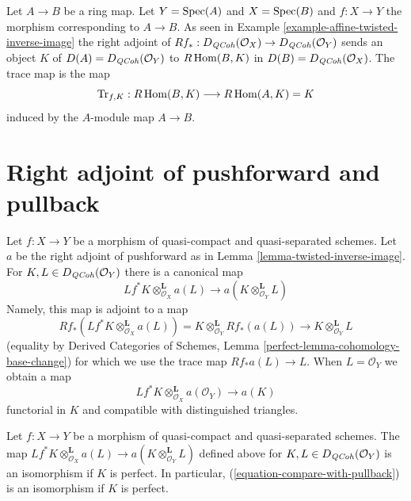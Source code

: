 \begin{example}
\label{example-trace-affine}
Let $A \to B$ be a ring map. Let $Y = \mathop{\mathrm{Spec}}(A)$ and $X = \mathop{\mathrm{Spec}}(B)$
and $f : X \to Y$ the morphism corresponding to $A \to B$. As seen
in Example \ref{example-affine-twisted-inverse-image}
the right adjoint of
$Rf_* : D_{\mathit{QCoh}}(\mathcal{O}_X) \to D_{\mathit{QCoh}}(\mathcal{O}_Y)$
sends an object $K$ of $D(A) = D_{\mathit{QCoh}}(\mathcal{O}_Y)$ to $R\mathop{\mathrm{Hom}}\nolimits(B, K)$ in
$D(B) = D_{\mathit{QCoh}}(\mathcal{O}_X)$. The trace map is the map
$$
\text{Tr}_{f, K} : R\mathop{\mathrm{Hom}}\nolimits(B, K) \longrightarrow R\mathop{\mathrm{Hom}}\nolimits(A, K) = K
$$
induced by the $A$-module map $A \to B$.
\end{example}




\section{Right adjoint of pushforward and pullback}
\label{section-compare-with-pullback}

\noindent
Let $f : X \to Y$ be a morphism of quasi-compact and quasi-separated
schemes. Let $a$ be the right adjoint of pushforward as in
Lemma \ref{lemma-twisted-inverse-image}. For $K, L \in D_{\mathit{QCoh}}(\mathcal{O}_Y)$
there is a canonical map
$$
Lf^*K \otimes^\mathbf{L}_{\mathcal{O}_X} a(L)
\longrightarrow
a(K \otimes_{\mathcal{O}_Y}^\mathbf{L} L)
$$
Namely, this map is adjoint to a map
$$
Rf_*(Lf^*K \otimes^\mathbf{L}_{\mathcal{O}_X} a(L)) =
K \otimes^\mathbf{L}_{\mathcal{O}_Y} Rf_*(a(L))
\longrightarrow
K \otimes^\mathbf{L}_{\mathcal{O}_Y} L
$$
(equality by Derived Categories of Schemes, Lemma
\ref{perfect-lemma-cohomology-base-change})
for which we use the trace map $Rf_*a(L) \to L$.
When $L = \mathcal{O}_Y$ we obtain a map
\begin{equation}
\label{equation-compare-with-pullback}
Lf^*K \otimes^\mathbf{L}_{\mathcal{O}_X} a(\mathcal{O}_Y) \longrightarrow a(K)
\end{equation}
functorial in $K$ and compatible with distinguished triangles.

\begin{lemma}
\label{lemma-compare-with-pullback-perfect}
Let $f : X \to Y$ be a morphism of quasi-compact and quasi-separated
schemes. The map
$Lf^*K \otimes^\mathbf{L}_{\mathcal{O}_X} a(L) \to
a(K \otimes_{\mathcal{O}_Y}^\mathbf{L} L)$
defined above for $K, L \in D_{\mathit{QCoh}}(\mathcal{O}_Y)$
is an isomorphism if $K$ is perfect. In particular,
(\ref{equation-compare-with-pullback}) is an isomorphism if $K$ is perfect.
\end{lemma}

